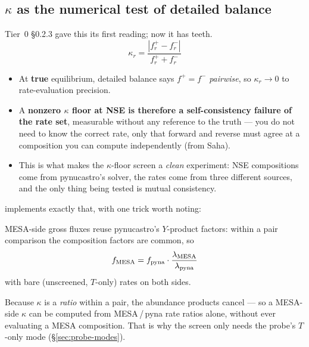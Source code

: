 \subsection{\texorpdfstring{$\kappa$}{kappa} as the numerical test of detailed balance}
\label{sec:kappa-db}

Tier~0 \S0.2.3 gave this its first reading; now it has teeth.
%
\begin{equation*}
\kappa_r = \frac{|f^+_r - f^-_r|}{f^+_r + f^-_r}
\end{equation*}

\begin{itemize}
\item At \textbf{true} equilibrium, detailed balance says $f^+ = f^-$
      \emph{pairwise}, so $\kappa_r \to 0$ to rate-evaluation precision.
\item A \textbf{nonzero $\kappa$ floor at NSE is therefore a self-consistency
      failure of the rate set}, measurable without any reference to the truth
      --- you do not need to know the correct rate, only that forward and
      reverse must agree at a composition you can compute independently (from
      Saha).
\item This is what makes the $\kappa$-floor screen a \emph{clean} experiment:
      NSE compositions come from pynucastro's solver, the rates come from three
      different sources, and the only thing being tested is mutual consistency.
\end{itemize}

 implements exactly that, with one trick worth noting:

\begin{aside}
MESA-side gross fluxes reuse pynucastro's $Y$-product factors: within a pair
comparison the composition factors are common, so
\begin{equation*}
f_{\rm MESA} = f_{\rm pyna}\cdot\frac{\lambda_{\rm MESA}}{\lambda_{\rm pyna}}
\end{equation*}
with bare (unscreened, $T$-only) rates on both sides.
\end{aside}

Because $\kappa$ is a \emph{ratio} within a pair, the abundance products cancel
--- so a MESA-side $\kappa$ can be computed from MESA\,/\,pyna rate ratios
alone, without ever evaluating a MESA composition. That is why the screen only
needs the probe's $T$-only  mode (\S\ref{sec:probe-modes}).

